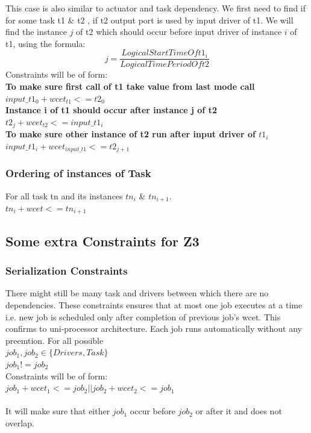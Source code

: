 \documentclass[16pt]{report}
\begin{document}
This case is also similar to actuator and task dependency. We first need to find if for some task t1 \& t2  , if t2 output port is used by input driver of t1. We will find the instance $j$ of t2 which should occur before input driver of instance $i$ of t1, using the formula:
\begin{equation}
    j = \frac{Logical Start Time Of t1_i}{Logical Time Period Of t2}
\end{equation}
\noindent
Constraints will be of form:\\
\textbf{To make sure first call of t1 take value from last mode call}\\
$ input\_t1_0 + wcet_{t1}  <= t2_0$\\
\textbf{Instance i of t1 should occur after instance j of t2}\\
$t2_j + wcet_{t2} <= input\_t1_i$\\
\textbf{To make sure other instance of t2 run after input driver of $t1_i$}\\
$input\_t1_i + wcet_{input\_t1} <= t2_{j+1}$

\subsubsection{Ordering of instances of Task}
For all task tn and its instances $tn_i$ \& $tn_{i+1}$.\\
$tn_i + wcet <= tn_{i+1}$

\subsection{Some extra Constraints for Z3}
\subsubsection{Serialization Constraints}
There might still be many task and drivers between which there are no dependencies. These constraints ensures that at most one job executes at a time i.e.  new job is scheduled only after completion of previous job's wcet. This confirms to uni-processor architecture. Each job runs automatically without any preemtion.
For all possible\\
$job_1 , job_2 \in \{Drivers, Task\}$\\
$job_1 != job_2$\\
Constraints will be of form:\\
$ job_1 + wcet_1 <= job_2 || job_2 + wcet_2 <= job_1$\\\\
It will make sure that either $job_1$  occur before $job_2$ or after it and does not overlap.
\end{document}
